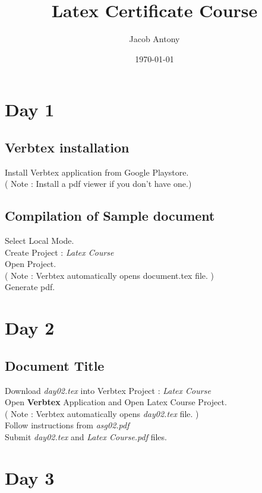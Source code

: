 \documentclass{article}
\title{Latex Certificate Course}
\author{Jacob Antony}
\date{\today}
\begin{document}
\maketitle

\tableofcontents

\section{Day 1}

\subsection{Verbtex installation}
Install Verbtex application from Google Playstore.\\
( Note : Install a pdf viewer if you don't have one.)

\subsection*{Compilation of Sample document}
Select Local Mode.\\
Create Project : \textit{Latex Course}\\
Open Project.\\
( Note : Verbtex automatically opens document.tex file. )\\
Generate pdf.

\section{Day 2}

\subsection{Document Title}
Download \textit{day02.tex} into Verbtex Project : \textit{Latex Course}\\
Open \textbf{Verbtex} Application and Open Latex Course Project.\\
( Note : Verbtex automatically opens \textit{day02.tex} file. )\\
Follow instructions from \textit{asg02.pdf}\\
Submit \textit{day02.tex} and \textit{Latex Course.pdf} files.

\section{Day 3}
\end{document}
